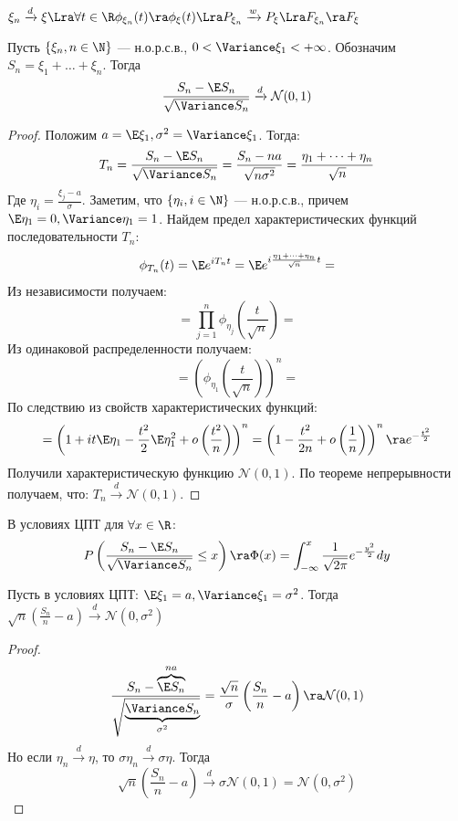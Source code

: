 \begin{corollary}
    \(\xi_n \xrightarrow{d} \xi \Lra \forall t \in \R \phi_{\xi_n}(t) \ra \phi_\xi(t) \Lra P_{\xi_n} \xrightarrow{w} P_\xi \Lra F_{\xi_n} \ra F_{\xi}\)
\end{corollary}

\begin{theorem}
    Пусть \(\{\xi_n, n \in \N\}\) --- н.о.р.с.в., \(0 < \Variance \xi_1 < +\infty\). Обозначим \(S_n = \xi_1 + \dots + \xi_n\). Тогда 
    \[\frac{S_n - \E S_n}{\sqrt{\Variance S_n}} \xrightarrow{d} \mathcal{N}(0, 1)\]
\end{theorem}
\begin{proof}
    Положим \(a = \E\xi_1, \sigma^2 = \Variance \xi_1\). Тогда:
    \[T_n = \frac{S_n - \E S_n}{\sqrt{\Variance S_n}} = \frac{S_n - na}{\sqrt{n\sigma^2}} = \frac{\eta_1 + \dots + \eta_n}{\sqrt{n}}\]
    Где \(\eta_i = \frac{\xi_j - a}{\sigma}\). Заметим, что \(\{\eta_i, i \in \N\}\) --- н.о.р.с.в., причем \(\E \eta_1 = 0, \Variance \eta_1 = 1\). Найдем предел характеристических функций последовательности \(T_n\):
    \[\phi_{T_n}(t) = \E e^{iT_nt} = \E e^{i \frac{\eta_1 + \dots + \eta_n}{\sqrt{n}}t} = \]
    Из независимости получаем:
    \[= \prod_{j = 1}^n \phi_{\eta_j}\left( \frac{t}{\sqrt{n}} \right) = \]
    Из одинаковой распределенности получаем:
    \[= (\phi_{\eta_1}\left( \frac{t}{\sqrt{n}} \right))^n = \]
    По следствию из свойств характеристических функций:
    \[= \left( 1 + it\E\eta_1 - \frac{t^2}{2}\E\eta_1^2 + o\left( \frac{t^2}{n} \right) \right)^n = \left(1 - \frac{t^2}{2n} + o\left( \frac{1}{n} \right)\right)^n \ra e^{-\frac{t^2}{2}}\]
    Получили характеристическую функцию \(\mathcal{N}(0, 1)\). По теореме непрерывности получаем, что: \(T_n \xrightarrow{d} \mathcal{N}(0, 1)\).
\end{proof}

\begin{corollary}
    В условиях ЦПТ для \(\forall x \in \R\):
    \[P\left( \frac{S_n - \E S_n}{\sqrt{\Variance S_n}} \le x \right) \ra \Phi(x) = \int_{-\infty}^x \frac{1}{\sqrt{2\pi}}e^{-\frac{y^2}{2}}dy\]
\end{corollary}

\begin{corollary}
    Пусть в условиях ЦПТ: \(\E\xi_1 = a, \Variance \xi_1 = \sigma^2\). Тогда \(\sqrt{n}\left( \frac{S_n}{n} - a \right) \xrightarrow{d} \mathcal{N}(0, \sigma^2)\)
\end{corollary}
\begin{proof}
    \[\frac{S_n - \overbrace{\E S_n}^{na}}{\sqrt{\underbrace{\Variance S_n}_{\sigma^2}}} = \frac{\sqrt{n}}{\sigma}\left( \frac{S_n}{n} - a \right) \ra \mathcal{N}(0, 1)\]
    Но если \(\eta_n \xrightarrow{d} \eta\), то \(\sigma \eta_n \xrightarrow{d} \sigma \eta\). Тогда
    \[\sqrt{n}\left( \frac{S_n}{n} - a \right) \xrightarrow{d} \sigma\mathcal{N}(0, 1) = \mathcal{N}(0, \sigma^2)\]
\end{proof}


